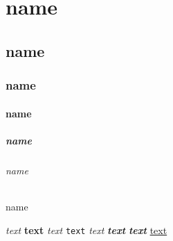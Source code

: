 \documentclass[12pt]{article}
\begin{document}


\part{name}
\chapter{name}
\section{name}
\subsection{name}
\subsubsection{name}
\paragraph{name}
\subparagraph{name}



\emph{text}
\textbf{text}
\textit{text}
\texttt{text}
\textsl{text}
\textbf{\textit{text}}
\textit{\textbf{text}}
\underline{text}


\end{document}
